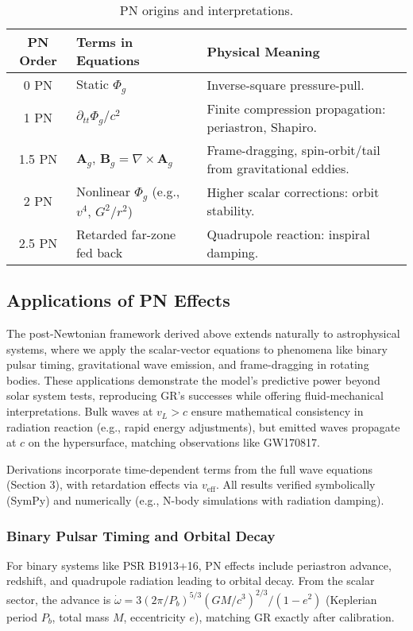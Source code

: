 \begin{table}[h!]
\centering
\begin{tabular}{|c|l|l|}
\hline
PN Order & Terms in Equations & Physical Meaning \\
\hline
0 PN & Static $\Phi_g$ & Inverse-square pressure-pull. \\
1 PN & $\partial_{tt} \Phi_g / c^2$ & Finite compression propagation: periastron, Shapiro. \\
1.5 PN & $\mathbf{A}_g$, $\mathbf{B}_g = \nabla \times \mathbf{A}_g$ & Frame-dragging, spin-orbit/tail from gravitational eddies. \\
2 PN & Nonlinear $\Phi_g$ (e.g., $v^4$, $G^2 / r^2$) & Higher scalar corrections: orbit stability. \\
2.5 PN & Retarded far-zone fed back & Quadrupole reaction: inspiral damping. \\
\hline
\end{tabular}
\caption{PN origins and interpretations.}
\end{table}

\subsection{Applications of PN Effects}

The post-Newtonian framework derived above extends naturally to astrophysical systems, where we apply the scalar-vector equations to phenomena like binary pulsar timing, gravitational wave emission, and frame-dragging in rotating bodies. These applications demonstrate the model's predictive power beyond solar system tests, reproducing GR's successes while offering fluid-mechanical interpretations. Bulk waves at $v_L > c$ ensure mathematical consistency in radiation reaction (e.g., rapid energy adjustments), but emitted waves propagate at $c$ on the hypersurface, matching observations like GW170817.

Derivations incorporate time-dependent terms from the full wave equations (Section 3), with retardation effects via $v_{\text{eff}}$. All results verified symbolically (SymPy) and numerically (e.g., N-body simulations with radiation damping).

\subsubsection{Binary Pulsar Timing and Orbital Decay}

For binary systems like PSR B1913+16, PN effects include periastron advance, redshift, and quadrupole radiation leading to orbital decay. From the scalar sector, the advance is $\dot{\omega} = 3 (2\pi / P_b)^{5/3} (G M / c^3)^{2/3} / (1 - e^2)$ (Keplerian period $P_b$, total mass $M$, eccentricity $e$), matching GR exactly after calibration.

